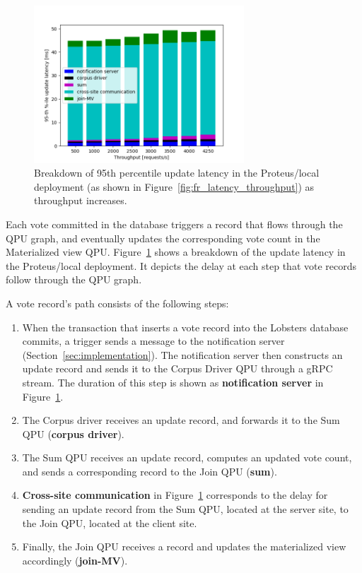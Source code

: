 \begin{figure}[H]
\centering
  \includegraphics[width=0.7\textwidth]{./figures/evaluation/fr_latency_throughput_breakdown.png}
  \caption{Breakdown of 95th percentile update latency in the Proteus/local deployment
  (as shown in Figure~\ref{fig:fr_latency_throughput}) as throughput increases.}
  \label{fig:fr_latency_throughput_breakdown}
\end{figure}

Each vote committed in the database triggers a record that flows through the QPU graph, and eventually updates the corresponding
vote count in the Materialized view QPU.
Figure~\ref{fig:fr_latency_throughput_breakdown} shows a breakdown of the update latency in the Proteus/local
deployment.
It depicts the delay at each step that vote records follow through the QPU graph.

A vote record's path consists of the following steps:
\begin{enumerate}
  \item When the transaction that inserts a vote record into the Lobsters database commits,
  a trigger sends a message to the notification server (Section~\ref{sec:implementation}).
  The notification server then constructs an update record and sends it to the Corpus Driver QPU through a gRPC stream.
  The duration of this step is shown as \textbf{notification server} in Figure~\ref{fig:fr_latency_throughput_breakdown}.

  \item The Corpus driver receives an update record, and forwards it to the Sum QPU (\textbf{corpus driver}).

  \item The Sum QPU receives an update record, computes an updated vote count,
  and sends a corresponding record to the Join QPU (\textbf{sum}).

  \item \textbf{Cross-site communication} in Figure~\ref{fig:fr_latency_throughput_breakdown} corresponds to the delay for
  sending an update record from the Sum QPU, located at the server site, to the Join QPU, located at the client site.

  \item Finally, the Join QPU receives a record and updates the materialized view accordingly (\textbf{join-MV}).

\end{enumerate}

